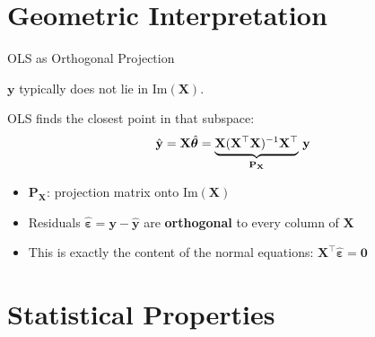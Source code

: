 \documentclass[aspectratio=169, professionalfonts]{beamer}
\begin{document}
\section{Geometric Interpretation}

\begin{frame}{OLS as Orthogonal Projection}

$\mathbf{y}$ typically does not lie in $\text{Im}(\mathbf{X})$.

\bigskip

OLS finds the closest point in that subspace:
$$\hat{\mathbf{y}}
  = \mathbf{X}\hat{\bm{\theta}}
  = \underbrace{\mathbf{X}(\mathbf{X}^\top\mathbf{X})^{-1}\mathbf{X}^\top}_%
    {\mathbf{P}_{\mathbf{X}}}\,\mathbf{y}$$

\bigskip

\begin{itemize}
  \item $\mathbf{P}_{\mathbf{X}}$: projection matrix onto
        $\text{Im}(\mathbf{X})$
  \item Residuals $\hat{\bm{\varepsilon}} = \mathbf{y} - \hat{\mathbf{y}}$
        are \textbf{orthogonal} to every column of $\mathbf{X}$
  \item This is exactly the content of the normal equations:
        $\mathbf{X}^\top\hat{\bm{\varepsilon}} = \mathbf{0}$
\end{itemize}

\end{frame}

\section{Statistical Properties}
\end{document}
